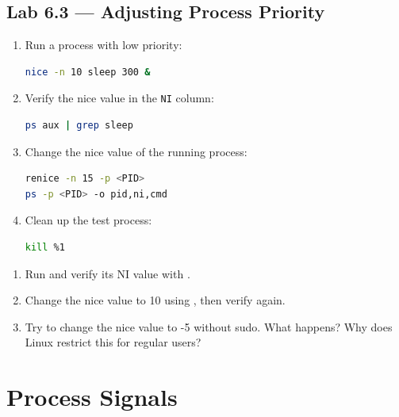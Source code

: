 \subsection*{Lab 6.3 --- Adjusting Process Priority}

\begin{enumerate}
  \item Run a process with low priority:
\begin{lstlisting}[language=bash, caption={Running a process with nice +10}]
nice -n 10 sleep 300 &
\end{lstlisting}

  \item Verify the nice value in the \texttt{NI} column:
\begin{lstlisting}[language=bash, caption={Viewing the nice value}]
ps aux | grep sleep
\end{lstlisting}

  \item Change the nice value of the running process:
\begin{lstlisting}[language=bash, caption={Changing nice with renice}]
renice -n 15 -p <PID>
ps -p <PID> -o pid,ni,cmd
\end{lstlisting}

  \item Clean up the test process:
\begin{lstlisting}[language=bash, caption={Stopping the test process}]
kill %1
\end{lstlisting}
\end{enumerate}

\begin{exercisebox}[6.3]
  \begin{enumerate}
    \item Run  and verify its NI value with
      .
    \item Change the nice value to 10 using , then verify again.
    \item Try to change the nice value to -5 without sudo. What happens? Why
      does Linux restrict this for regular users?
  \end{enumerate}
\end{exercisebox}

\section{Process Signals}
\label{sec:process-signals}

